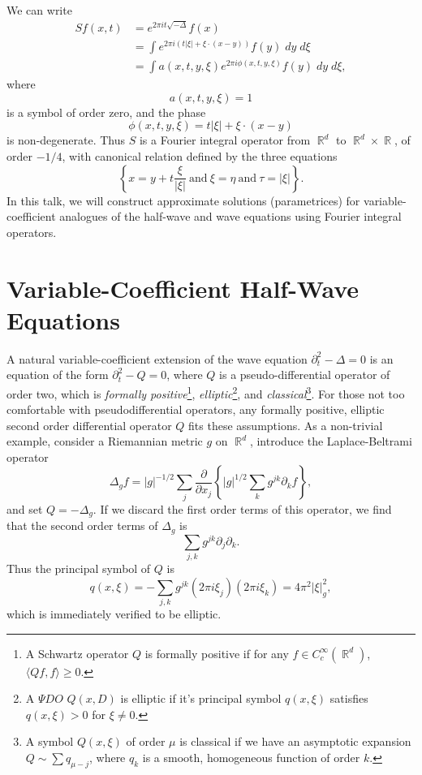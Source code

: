 \documentclass{article}
\theoremstyle{plain}
\theoremstyle{remark}
\theoremstyle{definition}
\DeclareMathOperator{\RR}{\mathbb{R}}
\begin{document}
We can write
%
\begin{align*}
	Sf(x,t) &= e^{2 \pi it \sqrt{-\Delta}} f(x)\\
	&= \int e^{2 \pi i (t |\xi| + \xi \cdot (x - y))} f(y)\; dy\; d\xi\\
	&= \int a(x,t,y,\xi) e^{2 \pi i \phi(x,t,y,\xi)} f(y)\; dy\; d\xi,
\end{align*}
%
where
%
\[ a(x,t,y,\xi) = 1 \]
%
is a symbol of order zero, and the phase
%
\[ \phi(x,t,y,\xi) = t |\xi| + \xi \cdot (x - y) \]
%
is non-degenerate. Thus $S$ is a Fourier integral operator from $\RR^d$ to $\RR^d \times \RR$, of order $-1/4$, with canonical relation defined by the three equations
%
\[ \left\{ x = y + t \frac{\xi}{|\xi|}\ \text{and}\ \xi = \eta\ \text{and}\ \tau = |\xi| \right\}. \]
%
In this talk, we will construct approximate solutions (parametrices) for variable-coefficient analogues of the half-wave and wave equations using Fourier integral operators.

\section{Variable-Coefficient Half-Wave Equations}

A natural variable-coefficient extension of the wave equation $\partial_t^2 - \Delta = 0$ is an equation of the form $\partial_t^2 - Q = 0$, where $Q$ is a pseudo-differential operator of order two, which is \emph{formally positive}\footnote{A Schwartz operator $Q$ is formally positive if for any $f \in C_c^\infty(\RR^d)$, $\langle Qf, f \rangle \geq 0$.}, \emph{elliptic}\footnote{A ${\Psi}DO$ $Q(x,D)$ is elliptic if it's principal symbol $q(x,\xi)$ satisfies $q(x,\xi) > 0$ for $\xi \neq 0$.}, and \emph{classical}\footnote{A symbol $Q(x,\xi)$ of order $\mu$ is classical if we have an asymptotic expansion $Q \sim \sum q_{\mu-j}$, where $q_k$ is a smooth, homogeneous function of order $k$.}. For those not too comfortable with pseudodifferential operators, any formally positive, elliptic second order differential operator $Q$ fits these assumptions. As a non-trivial example, consider a Riemannian metric $g$ on $\RR^d$, introduce the Laplace-Beltrami operator
%
\[ \Delta_g f = |g|^{-1/2} \sum_j \frac{\partial}{\partial x_j} \left\{ |g|^{1/2} \sum_k g^{jk} \partial_k f \right\}, \]
%
and set $Q = - \Delta_g$. If we discard the first order terms of this operator, we find that the second order terms of $\Delta_g$ is
%
\[ \sum_{j,k} g^{jk} \partial_j \partial_k. \]
%
Thus the principal symbol of $Q$ is
%
\[ q(x,\xi) = - \sum_{j,k} g^{jk} ( 2 \pi i \xi_j ) (2 \pi i \xi_k) = 4 \pi^2 |\xi|_g^2, \]
%
which is immediately verified to be elliptic.
\end{document}
